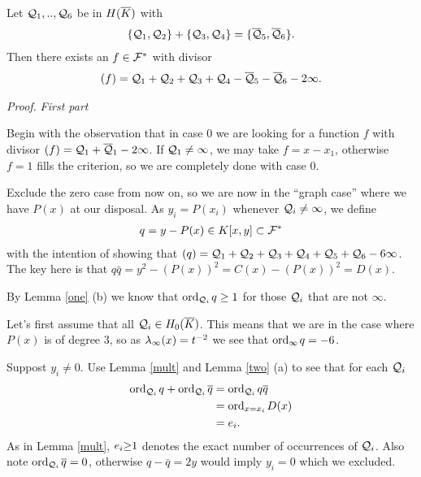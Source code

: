 \documentclass[english,11pt,a4paper]{article}
\begin{document}
\begin{theorem}\label{hhs}
  Let $\mathcal{Q}_1,..,\mathcal{Q}_6$ be in $H(\overline K)$ with
  \begin{align*}
    \{ \mathcal{Q}_1 , \mathcal{Q}_2\}+\{\mathcal{Q}_3 , \mathcal{Q}_4\} = \{\overline {\mathcal{Q}}_5 , \overline {\mathcal{Q}}_6 \}.
  \end{align*}
  Then there exists an $f \in \mathcal{F}^*$ with divisor
  \begin{align*}
    (f) = \mathcal{Q}_1 + \mathcal{Q}_2 + \mathcal{Q}_3 + \mathcal{Q}_4 - \overline {\mathcal{Q}}_5 - \overline {\mathcal{Q}}_6 - 2 \infty.
  \end{align*}
\end{theorem}

\newpage

\emph{Proof.} \textit{First part}

Begin with the observation that in case 0 we are looking for a function $f$ with divisor $(f) = \mathcal{Q}_1 + \overline {\mathcal{Q}}_1 - 2 \infty$. If $\mathcal{Q}_1 \neq \infty$, we may take $f = x-x_1$, otherwise $f = 1$ fills the criterion, so we are completely done with case 0.

Exclude the zero case from now on, so we are now in the ``graph case'' where we have $P(x)$ at our disposal. As $y_i = P(x_i)$ whenever $\mathcal{Q}_i \neq \infty$, we define
\begin{align*}
  q = y -P(x) \in K[x,y] \subset \mathcal{F}^*
\end{align*}
with the intention of showing that $(q) = \mathcal{Q}_1 + \mathcal{Q}_2 + \mathcal{Q}_3 + \mathcal{Q}_4 + \mathcal{Q}_5 + \mathcal{Q}_6 - 6 \infty$. The key here is that $q \bar q = y^2 -(P(x))^2 = C(x) -(P(x))^2 = D(x)$.

By Lemma \ref{one} (b) we know that $\text{ord}_{\mathcal{Q}_i}\hspace{0.4mm} q \geq 1$ for those $\mathcal{Q}_i$ that are not $\infty$.

Let's first assume that all $\mathcal{Q}_i \in H_0(\overline K)$. This means that we are in the case where $P(x)$ is of degree 3, so as $\lambda_{\infty} (x) = t^{-2}$ we see that $\text{ord}_{\infty}\hspace{0.4mm} q = -6$.

Suppost $y_i \neq 0$. Use Lemma \ref{mult} and Lemma \ref{two} (a) to see that for each $\mathcal{Q}_i$
\begin{align*}
  \text{ord}_{\mathcal{Q}_i}\hspace{0.4mm} q + \text{ord}_{\mathcal{Q}_i}\hspace{0.4mm} \overline q &= \text{ord}_{\mathcal{Q}_i}\hspace{0.4mm} q \overline q\\
                  &= \text{ord}_{x=x_i}\hspace{0.4mm} D(x)\\
                  &= e_i.
\end{align*}
As in Lemma \ref{mult}, $e_i \hspace{-1mm}\geq\hspace{-1mm} 1$ denotes the exact number of occurrences of $\mathcal{Q}_i$. Also note $\text{ord}_{\mathcal{Q}_i}\hspace{0.4mm} \overline q = 0$, otherwise $q - \bar q = 2y$ would imply $y_i = 0$ which we excluded.
\end{document}
